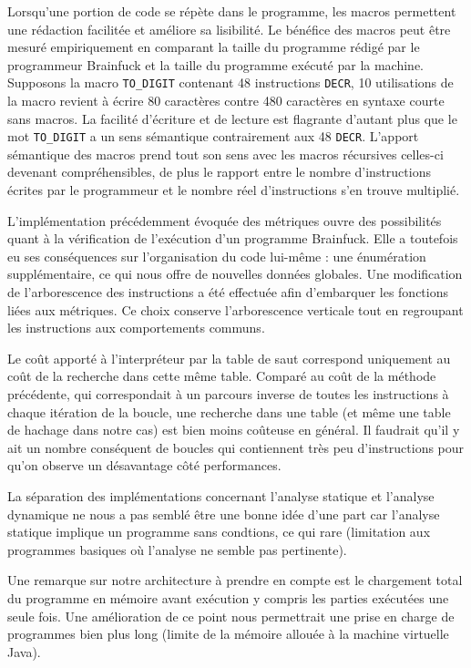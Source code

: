 \documentclass{article}
\begin{document}
Lorsqu’une portion de code se répète dans le programme, les macros permettent une rédaction facilitée et améliore sa lisibilité. Le bénéfice des macros peut être mesuré empiriquement en comparant la taille du programme rédigé par le programmeur Brainfuck et la taille du programme exécuté par la machine. Supposons la macro \texttt{TO\_DIGIT} contenant 48 instructions \texttt{DECR}, 10 utilisations de la macro revient à écrire 80 caractères contre 480 caractères en syntaxe courte sans macros. La facilité d'écriture et de lecture est flagrante d'autant plus que le mot \texttt{TO\_DIGIT} a un sens sémantique contrairement aux 48 \texttt{DECR}. L'apport sémantique des macros prend tout son sens avec les macros récursives celles-ci devenant compréhensibles, de plus le rapport entre le nombre d'instructions écrites par le programmeur et le nombre réel d'instructions s'en trouve multiplié.

L'implémentation précédemment évoquée des métriques ouvre des possibilités quant à la vérification de l'exécution d'un programme Brainfuck. Elle a toutefois eu ses conséquences sur l'organisation du code lui-même : une énumération supplémentaire, ce qui nous offre de nouvelles données globales. Une modification de l'arborescence des instructions a été effectuée afin d'embarquer les fonctions liées aux métriques. Ce choix conserve l'arborescence verticale tout en regroupant les instructions aux comportements communs. 

Le coût apporté à l'interpréteur par la table de saut correspond uniquement au coût de la recherche dans cette même table. Comparé au coût de la méthode précédente, qui correspondait à un parcours inverse de toutes les instructions à chaque itération de la boucle, une recherche dans une table (et même une table de hachage dans notre cas) est bien moins coûteuse en général. Il faudrait qu'il y ait un nombre conséquent de boucles qui contiennent très peu d'instructions pour qu'on observe un désavantage côté performances.

La séparation des implémentations concernant l'analyse statique et l'analyse dynamique ne nous a pas semblé être une bonne idée d'une part car l'analyse  statique implique un programme sans condtions, ce qui rare (limitation aux programmes basiques où l'analyse ne semble pas pertinente).

Une remarque sur notre architecture à prendre en compte est le chargement total du programme en mémoire avant exécution y compris les parties exécutées une seule fois. Une amélioration de ce point nous permettrait une prise en charge de programmes bien plus long (limite de la mémoire allouée à la machine virtuelle Java).
\end{document}
